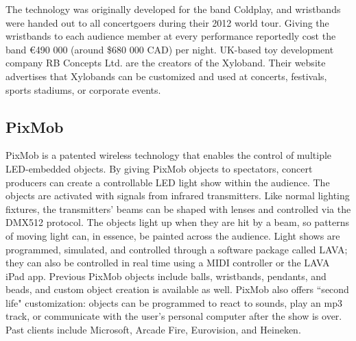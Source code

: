 The technology was originally developed for the band Coldplay, and wristbands were handed out to all concertgoers during their 2012 world tour. Giving the wristbands to each audience member at every performance reportedly cost the band \euro{}490 000 (around \$680 000 CAD) per night. UK-based toy development company RB Concepts Ltd. are the creators of the Xyloband. Their website advertises that Xylobands can be customized and used at concerts, festivals, sports stadiums, or corporate events.

\subsection{PixMob}

PixMob is a patented wireless technology that enables the control of multiple LED-embedded objects. By giving PixMob objects to spectators, concert producers can create a controllable LED light show within the audience. The objects are activated with signals from infrared transmitters. Like normal lighting fixtures, the transmitters' beams can be shaped with lenses and controlled via the DMX512 protocol. The objects light up when they are hit by a beam, so patterns of moving light can, in essence, be painted across the audience. Light shows are programmed, simulated, and controlled through a software package called LAVA; they can also be controlled in real time using a MIDI controller or the LAVA iPad app. Previous PixMob objects include balls, wristbands, pendants, and beads, and custom object creation is available as well. PixMob also offers ``second life" customization: objects can be programmed to react to sounds, play an mp3 track, or communicate with the user's personal computer after the show is over. Past clients include Microsoft, Arcade Fire, Eurovision, and Heineken.